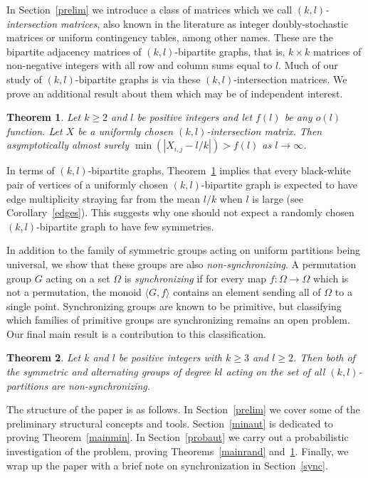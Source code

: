\documentclass{daj}
\theoremstyle{plain}
\newtheorem{theorem}{Theorem}[section]
\theoremstyle{definition}
\begin{document}
In Section~\ref{prelim} we introduce a class of matrices which we call \emph{$(k,l)$-intersection matrices}, also known in the literature as integer doubly-stochastic matrices or uniform contingency tables, among other names. These are the bipartite adjacency matrices of $(k,l)$-bipartite graphs, that is, $k\times k$ matrices of non-negative integers with all row and column sums equal to $l$. Much of our study of $(k,l)$-bipartite graphs is via these $(k,l)$-intersection matrices. We prove an additional result about them which may be of independent interest.
\begin{theorem}\label{main4}
Let $k\geq2$ and $l$ be positive integers and let $f(l)$ be any $o(l)$ function. Let $X$ be a uniformly chosen $(k,l)$-intersection matrix. Then asymptotically almost surely $\min(|X_{i,j}-l/k|)>f(l)$ as $l\to \infty$.
\end{theorem}
In terms of $(k,l)$-bipartite graphs, Theorem~\ref{main4} implies that every black-white pair of vertices of a uniformly chosen $(k,l)$-bipartite graph is expected to have edge multiplicity straying far from the mean $l/k$ when $l$ is large (see Corollary~\ref{edges}). This suggests why one should not expect a randomly chosen $(k,l)$-bipartite graph to have few symmetries.

In addition to the family of symmetric groups acting on uniform partitions being universal, we show that these groups are also \emph{non-synchronizing}. A
permutation group $G$ acting on a set $\Omega$ is \emph{synchronizing} if for
every map $f:\Omega\to\Omega$ which is not a permutation, the monoid
$\langle G,f\rangle$ contains an element sending all of $\Omega$ to a single point. Synchronizing groups are known to be primitive, but classifying which families of primitive groups are synchronizing remains an open problem. Our final main result is a contribution to this classification.

\begin{theorem}\label{syncthm}
Let $k$ and $l$ be positive integers with $k\geq 3$ and $l\geq2$. Then both of the symmetric and alternating groups of degree $kl$ acting on the set of all $(k,l)$-partitions are
non-synchronizing.
\end{theorem}

The structure of the paper is as follows. In Section~\ref{prelim} we cover some of the preliminary structural concepts and tools. Section~\ref{minaut} is dedicated to proving Theorem~\ref{mainmin}. In Section~\ref{probaut} we carry out a probabilistic investigation of the problem, proving Theorems~\ref{mainrand} and~\ref{main4}. Finally, we wrap up the paper with a brief note on synchronization in Section~\ref{sync}.
\end{document}
